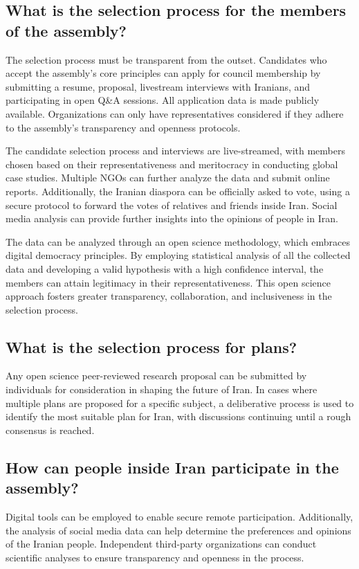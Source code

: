 \documentclass{IEEEtran}
\begin{document}
\subsection{What is the selection process for the members of the assembly?}
The selection process must be transparent from the outset. Candidates who accept the assembly's core principles can apply for council membership by submitting a resume, proposal, livestream interviews with Iranians, and participating in open Q&A sessions. All application data is made publicly available. Organizations can only have representatives considered if they adhere to the assembly's transparency and openness protocols.

The candidate selection process and interviews are live-streamed, with members chosen based on their representativeness and meritocracy in conducting global case studies. Multiple NGOs can further analyze the data and submit online reports. Additionally, the Iranian diaspora can be officially asked to vote, using a secure protocol to forward the votes of relatives and friends inside Iran. Social media analysis can provide further insights into the opinions of people in Iran.

The data can be analyzed through an open science methodology, which embraces digital democracy principles. By employing statistical analysis of all the collected data and developing a valid hypothesis with a high confidence interval, the members can attain legitimacy in their representativeness. This open science approach fosters greater transparency, collaboration, and inclusiveness in the selection process.
\subsection{What is the selection process for plans?}
Any open science peer-reviewed research proposal can be submitted by individuals for consideration in shaping the future of Iran. In cases where multiple plans are proposed for a specific subject, a deliberative process is used to identify the most suitable plan for Iran, with discussions continuing until a rough consensus is reached.

\subsection{How can people inside Iran participate in the assembly?}
Digital tools can be employed to enable secure remote participation. Additionally, the analysis of social media data can help determine the preferences and opinions of the Iranian people. Independent third-party organizations can conduct scientific analyses to ensure transparency and openness in the process.
\end{document}
